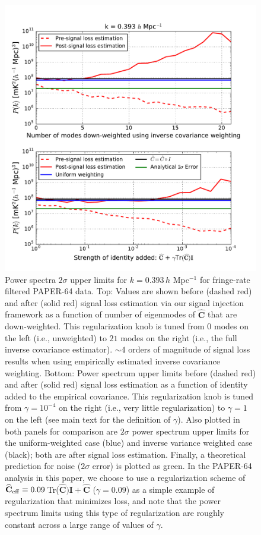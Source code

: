 \documentclass[preprint2,numberedappendix,tighten]{aastex6}  %
\begin{document}
\begin{figure}
	\centering
	\includegraphics[width=1\textwidth]{plots/sigloss_modeloop_2panel.pdf}
	\caption{Power spectra $2\sigma$ upper limits for $k=0.393$\,$h$ Mpc$^{-1}$ for fringe-rate filtered PAPER-64 data. Top: Values 
are shown before (dashed red) and after (solid red) signal loss estimation via our signal injection framework as a function of number of eigenmodes of $\widehat{\textbf{C}}$ that 
are down-weighted. This regularization knob is tuned from $0$ modes on the left (i.e., unweighted) to $21$ modes on the right (i.e., the full inverse 
covariance estimator). $\sim4$ orders of magnitude of signal loss results when using empirically estimated inverse covariance weighting. Bottom: Power spectrum upper limits before (dashed red) and after (solid red) signal loss estimation as a function of identity added to the empirical covariance. This regularization knob is tuned from $\gamma = 10^{-4}$ on the right (i.e., very little regularization) to $\gamma = 1$ on the left (see main text for the definition of $\gamma$). Also 
plotted in both panels for comparison are $2\sigma$ power spectrum upper limits for the uniform-weighted case (blue) and inverse variance 
weighted case (black); both are after signal loss estimation. Finally, a theoretical prediction for noise ($2\sigma$ error) is plotted 
as green. In the PAPER-64 analysis in this paper, we choose to use a regularization scheme of $\widehat{\textbf{C}}_{\rm eff} \equiv 0.09 \, $Tr($\widehat{\textbf{C}})\textbf{I} + \widehat{\textbf{C}}$ ($\gamma = 0.09$) as a simple example of regularization that minimizes loss, and note that the power spectrum limits using this type of regularization are roughly constant across a large range of values of $\gamma$.}
	\label{fig:sigloss_modeloop}
\end{figure}
\end{document}
